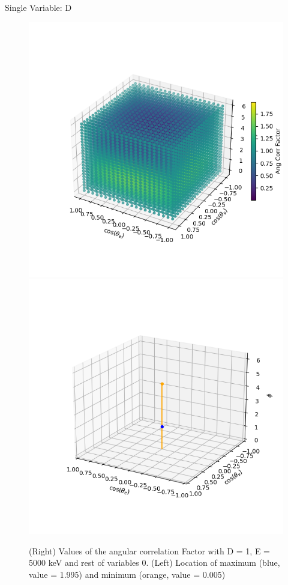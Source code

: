 \documentclass{beamer}
\begin{document}
\begin{frame}{Single Variable: D}
\begin{figure}
	\centering
	\includegraphics[width=0.4\paperwidth]{plots/D_3D_image.png}
	\includegraphics[width=0.4\paperwidth]{plots/D_max_min.png}
	\caption{(Right) Values of the angular correlation Factor with D = 1, E = 5000 keV and rest of variables 0. (Left) Location of maximum (blue, value = 1.995) and minimum (orange, value = 0.005)}	
\end{figure}
\end{frame}
\end{document}
